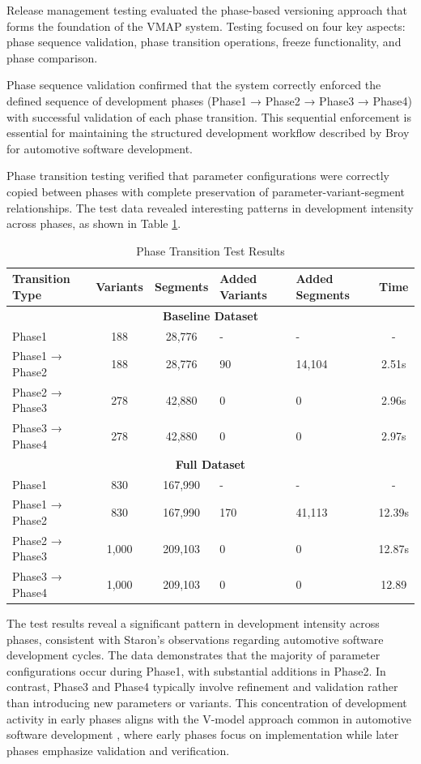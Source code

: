 Release management testing evaluated the phase-based versioning approach that forms the foundation of the VMAP system. Testing focused on four key aspects: phase sequence validation, phase transition operations, freeze functionality, and phase comparison.

Phase sequence validation confirmed that the system correctly enforced the defined sequence of development phases (Phase1 → Phase2 → Phase3 → Phase4) with successful validation of each phase transition. This sequential enforcement is essential for maintaining the structured development workflow described by Broy \cite{broy2006challenges} for automotive software development.

Phase transition testing verified that parameter configurations were correctly copied between phases with complete preservation of parameter-variant-segment relationships. The test data revealed interesting patterns in development intensity across phases, as shown in Table \ref{tab:phase-transition-results}.

\begin{table}[h]
\centering
\caption{Phase Transition Test Results}
\label{tab:phase-transition-results}
\begin{tabular}{|l|c|c|p{2cm}|p{2cm}|c|}
\hline
\textbf{Transition Type} & \textbf{Variants} & \textbf{Segments} & \textbf{Added Variants} & \textbf{Added Segments} & \textbf{Time} \\
\hline
\multicolumn{6}{|c|}{\textbf{Baseline Dataset}} \\
\hline
Phase1 & 188 & 28,776 & - & - & - \\
\hline
Phase1 → Phase2 & 188 & 28,776 & 90 & 14,104 & 2.51s \\
\hline
Phase2 → Phase3 & 278 & 42,880 & 0 & 0 & 2.96s \\
\hline
Phase3 → Phase4 & 278 & 42,880 & 0 & 0 & 2.97s \\
\hline
\multicolumn{6}{|c|}{\textbf{Full Dataset}} \\
\hline
Phase1 & 830 & 167,990 & - & - & - \\
\hline
Phase1 → Phase2 & 830 & 167,990 & 170 & 41,113 & 12.39s \\
\hline
Phase2 → Phase3 & 1,000 & 209,103 & 0 & 0 & 12.87s \\
\hline
Phase3 → Phase4 & 1,000 & 209,103 & 0 & 0 & 12.89 \\
\hline
\end{tabular}
\end{table}

The test results reveal a significant pattern in development intensity across phases, consistent with Staron's observations \cite{staron2021automotive} regarding automotive software development cycles. The data demonstrates that the majority of parameter configurations occur during Phase1, with substantial additions in Phase2. In contrast, Phase3 and Phase4 typically involve refinement and validation rather than introducing new parameters or variants. This concentration of development activity in early phases aligns with the V-model approach common in automotive software development \cite{pretschner2007software}, where early phases focus on implementation while later phases emphasize validation and verification.

